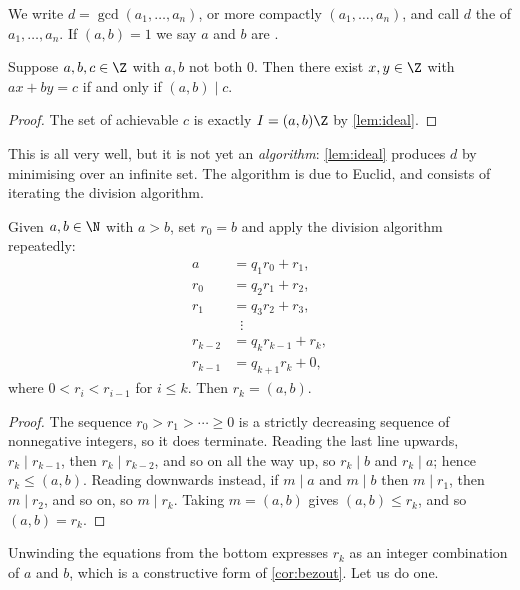 \begin{definition}
	We write $d = \gcd(a_1, \dots, a_n)$, or more compactly $(a_1, \dots, a_n)$, and call $d$ the  of $a_1, \dots, a_n$. If $(a, b) = 1$ we say $a$ and $b$ are .
\end{definition}

\begin{corollary}[Bézout]\label{cor:bezout}
	Suppose $a, b, c \in \Z$ with $a, b$ not both $0$. Then there exist $x, y \in \Z$ with $ax + by = c$ if and only if $(a, b) \mid c$.
\end{corollary}
\begin{proof}
	The set of achievable $c$ is exactly $I = (a,b)\Z$ by \autoref{lem:ideal}.
\end{proof}

This is all very well, but it is not yet an \emph{algorithm}: \autoref{lem:ideal} produces $d$ by minimising over an infinite set. The algorithm is due to Euclid, and consists of iterating the division algorithm.

\begin{theorem}
	Given $a, b \in \N$ with $a > b$, set $r_0 = b$ and apply the division algorithm repeatedly:
	\begin{align*}
		a &= q_1 r_0 + r_1, \\
		r_0 &= q_2 r_1 + r_2, \\
		r_1 &= q_3 r_2 + r_3, \\
		&\;\;\vdots \\
		r_{k - 2} &= q_k r_{k-1} + r_k, \\
		r_{k-1} &= q_{k+1} r_k + 0,
	\end{align*}
	where $0 < r_i < r_{i-1}$ for $i \leq k$. Then $r_k = (a, b)$.
\end{theorem}
\begin{proof}
	The sequence $r_0 > r_1 > \cdots \geq 0$ is a strictly decreasing sequence of nonnegative integers, so it does terminate. Reading the last line upwards, $r_k \mid r_{k-1}$, then $r_k \mid r_{k-2}$, and so on all the way up, so $r_k \mid b$ and $r_k \mid a$; hence $r_k \leq (a,b)$. Reading downwards instead, if $m \mid a$ and $m \mid b$ then $m \mid r_1$, then $m \mid r_2$, and so on, so $m \mid r_k$. Taking $m = (a,b)$ gives $(a, b) \leq r_k$, and so $(a,b) = r_k$.
\end{proof}

Unwinding the equations from the bottom expresses $r_k$ as an integer combination of $a$ and $b$, which is a constructive form of \autoref{cor:bezout}. Let us do one.

